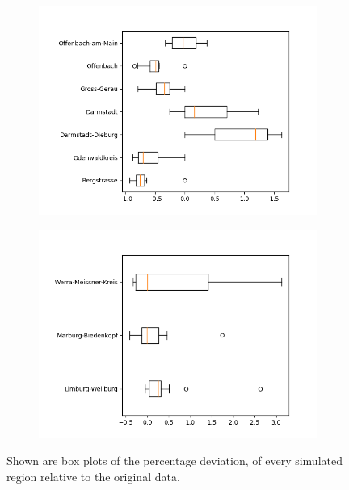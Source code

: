 \begin{figure}
\begin{subfigure}[b]{0.4\textwidth}
		\includegraphics[width=\textwidth]{./figures/50d/deviation_box50_alt3.png}	
	\end{subfigure}
	\begin{subfigure}[b]{0.4\textwidth}
		\centering
		\includegraphics[width=\textwidth]{./figures/50d/deviation_box50_alt4.png}	
	\end{subfigure}
	\caption{Shown are box plots of the percentage deviation, of every simulated region relative to the original data.}
	\label{fig:50_sim_box}
\end{figure}

